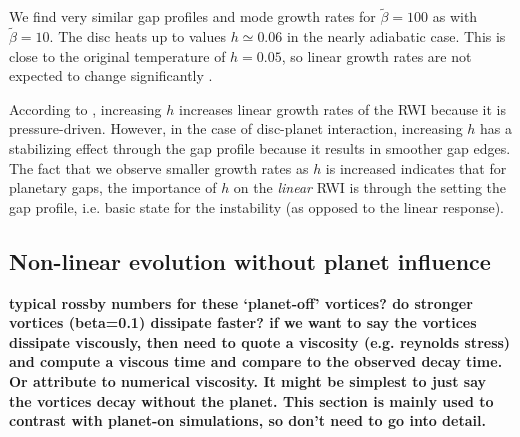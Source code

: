 We find very similar gap profiles and mode growth rates for
$\tilde{\beta}=100$ as with $\tilde{\beta}=10$. The disc heats up to
values $h\simeq0.06$ in the nearly adiabatic case. This is close to
the original temperature of $h=0.05$, so linear growth rates are not expected
to change significantly %
\citep{li00}. 

According to \cite{li00}, increasing $h$ increases linear growth rates
of the RWI because it is pressure-driven. However, in the case 
of disc-planet interaction, increasing $h$ has a stabilizing effect
through the gap profile because it results in smoother gap
edges. The fact that we observe smaller growth rates as $h$ is
increased indicates that for planetary gaps, the importance of $h$ on
the \emph{linear} RWI is through the setting the gap profile, i.e. basic
state for the instability (as opposed to the linear response). 






\subsection{Non-linear evolution without planet
  influence} \label{nonlinearplanetoff} 
{\bf typical rossby numbers for these `planet-off' vortices? do
  stronger vortices (beta=0.1) dissipate faster? if we want to say the
  vortices dissipate viscously, then need to quote a viscosity
  (e.g. reynolds stress) and compute a viscous time and compare to the
  observed decay time. Or attribute to numerical viscosity. It might
  be simplest to just say the vortices decay without the planet. This
  section is mainly used to contrast with planet-on simulations, so
  don't need to go into detail. 
}

